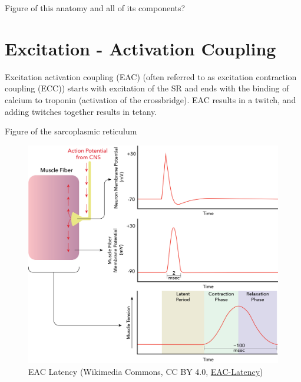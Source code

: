 


Figure of this anatomy and all of its components?

\section{Excitation - Activation Coupling}

Excitation activation coupling (EAC) (often referred to as excitation contraction coupling (ECC)) starts with excitation of the SR and ends with the binding of calcium to troponin (activation of the crossbridge). EAC results in a twitch, and adding twitches together results in tetany.

Figure of the sarcoplasmic reticulum


\begin{figure}[!ht]
    \centering
    \includegraphics[width=1\linewidth]{./figure/eac-latency.png}
    \caption{EAC Latency \footnotesize{(Wikimedia Commons, CC BY 4.0, \href{https://commons.wikimedia.org/wiki/File:The_latent_period_between_the_muscle_action_potential_and_contraction.png}{EAC-Latency})}}
    \label{fig:Motoneuron}
\end{figure}

